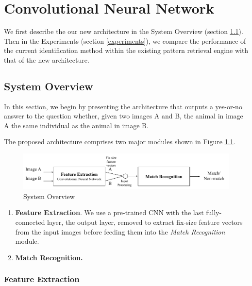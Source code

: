 \graphicspath{{./images/chap7/}}
\chapter{Convolutional Neural Network}

We first describe the our new architecture in the System Overview (section
\ref{system}). Then in the Experiments (section \ref{experiments}), we compare
the performance of the current identification method within the existing
pattern retrieval engine with that of the new architecture.

\section{System Overview} \label{system}

In this section, we begin by presenting the architecture that outputs a
yes-or-no answer to the question whether, given two images A and B, the animal
in image A the same individual as the animal in image B.

The proposed architecture comprises two major modules shown in Figure
\ref{fig:overview}.

\begin{figure}[h]
  \centering
  \includegraphics[width=\textwidth]{system/overview}
  \caption{System Overview}
  \label{fig:overview}
\end{figure}

\begin{enumerate}
  \item \textbf{Feature Extraction}. We use a pre-trained CNN with the last
  fully-connected layer, the output layer, removed to extract fix-size feature
  vectors from the input images before feeding them into the \emph{Match Recognition} module.
  \item \textbf{Match Recognition.}
\end{enumerate}

\subsection{Feature Extraction} 

